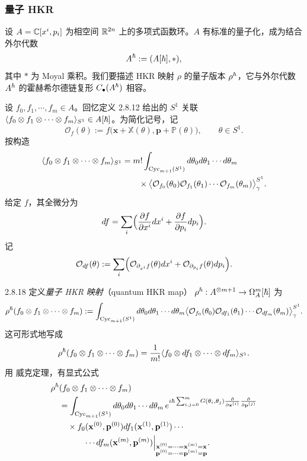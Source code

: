 \subsubsection*{量子 HKR}

设 $A=\mathbb{C}[x^i,p_i]$ 为相空间 $\mathbb{R}^{2n}$ 上的多项式函数环。$A$ 有标准的量子化，成为结合外尔代数
\[
A^\hbar:=(A[\hbar],*),
\]
其中 $*$ 为 Moyal 乘积。我们要描述 HKR 映射 $\rho$ 的量子版本 $\rho^\hbar$，它与外尔代数 $A^\hbar$ 的霍赫希尔德链复形 $C_\bullet(A^\hbar)$ 相容。

设 $f_0,f_1,\cdots,f_m\in A$。回忆定义 2.8.12 给出的 $S^1$ 关联
$\langle f_0\otimes f_1\otimes\cdots\otimes f_m\rangle_{S^1}\in A[\hbar]$。为简化记号，记
\[
\mathcal O_f(\theta):=f\bigl(\mathbf x+\mathbb X(\theta),\mathbf p+\mathbb P(\theta)\bigr),
\qquad \theta\in S^1.
\]
按构造
\[
\begin{aligned}
\langle f_0\otimes f_1\otimes\cdots\otimes f_m\rangle_{S^1}
&=m!\int_{\mathrm{Cyc}_{m+1}(S^1)}d\theta_0d\theta_1\cdots d\theta_m\\
&\qquad\times\bigl\langle\mathcal O_{f_0}(\theta_0)\mathcal O_{f_1}(\theta_1)\cdots
\mathcal O_{f_m}(\theta_m)\bigr\rangle_\gamma^{S^1}.
\end{aligned}
\]
给定 $f$，其全微分为
\[
d f=\sum_i\Bigl(\frac{\partial f}{\partial x^i}d x^i
+\frac{\partial f}{\partial p_i}d p_i\Bigr).
\]
记
\[
\mathcal O_{d f}(\theta):=\sum_i\Bigl(
\mathcal O_{\partial_{x^i}f}(\theta)d x^i
+\mathcal O_{\partial_{p_i}f}(\theta)d p_i\Bigr).
\]

\begin{definition}{2.8.18}
  定义\emph{量子 HKR 映射}（quantum HKR map）
  $\rho^\hbar:A^{\otimes m+1}\to\Omega^m_A[\hbar]$ 为
  \[
  \rho^\hbar(f_0\otimes f_1\otimes\cdots\otimes f_m)
  :=\int_{\mathrm{Cyc}_{m+1}(S^1)}d\theta_0d\theta_1\cdots d\theta_m
  \bigl\langle\mathcal O_{f_0}(\theta_0)\mathcal O_{d f_1}(\theta_1)\cdots
  \mathcal O_{d f_m}(\theta_m)\bigr\rangle_\gamma^{S^1}.
  \]
  这可形式地写成
  \[
  \rho^\hbar(f_0\otimes f_1\otimes\cdots\otimes f_m)
  =\frac1{m!}\langle f_0\otimes d f_1\otimes\cdots\otimes d f_m\rangle_{S^1}.
  \]
  用 威克定理，有显式公式
  \[
  \begin{aligned}
  &\rho^\hbar(f_0\otimes f_1\otimes\cdots\otimes f_m)\\
  &\quad=\int_{\mathrm{Cyc}_{m+1}(S^1)}d\theta_0d\theta_1\cdots d\theta_m\,
  e^{i\hbar\sum_{i,j=0}^mG(\theta_i,\theta_j)
  \frac{\partial}{\partial\mathbf x^{(i)}}\frac{\partial}{\partial\mathbf p^{(j)}}}\\
  &\qquad\times f_0(\mathbf x^{(0)},\mathbf p^{(0)})
  d f_1(\mathbf x^{(1)},\mathbf p^{(1)})\cdots\\
  &\qquad\qquad\cdots d f_m(\mathbf x^{(m)},\mathbf p^{(m)})
  \Big|_{\substack{\mathbf x^{(0)}=\cdots=\mathbf x^{(m)}=\mathbf x\\
  \mathbf p^{(0)}=\cdots=\mathbf p^{(m)}=\mathbf p}}.
  \end{aligned}
  \]
\end{definition}

